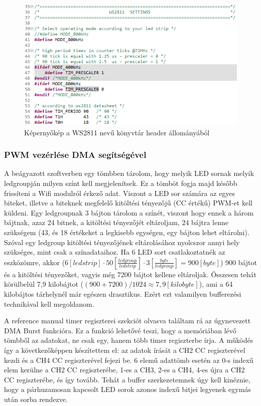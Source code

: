 \documentclass[../main.tex]{subfiles}
\begin{document}
            \begin{figure}[h!]
                \centering
                    \includegraphics[width=12cm]{mbed_res/ws2811_timing_values}
                \caption{Képernyőkép a WS2811 nevű könyvtár header állományából}
                \label{fig:ws2811_timing_values}
            \end{figure}
         
        \subsubsection{PWM vezérlése DMA segítségével}  
             A beágyazott szoftverben egy tömbben tárolom, hogy melyik LED sornak melyik ledgroupján milyen színt kell megjelenítsek. Ez a tömböt fogja majd később frissíteni a Wifi modulról érkező adat. Viszont a LED sor számára az egyes biteket, illetve a biteknek megfelelő kitöltési tényezőjű (CC értékű) PWM-et kell küldeni. Egy ledgroupnak 3 bájton tárolom a színét, viszont hogy ennek a három bájtnak, azaz 24 bitnek, a kitöltési tényezőjét eltároljam, 24 bájtra lenne szükségem (43, és 18 értékeket a legkisebb egységen, egy bájton lehet eltárolni). Szóval egy ledgroup kitöltési tényezőjének eltárolásához nyolcszor annyi hely szükséges, mint csak a színadataihoz. Ha 6 LED sort csatlakoztatnék az eszközömre, akkor ($ 6[ledstrip]\cdot 50 [\frac{ledgroup}{ledstrip}] \cdot 3 [\frac{byte}{ledgroup}] = 900 [byte]$) 900 bájtot és a kitöltési tényezőket, vagyis még 7200 bájtot kellene eltároljak. Összesen tehát körülbelül 7,9 kilobájtot ($ (900+7200)/1024 \approx 7,9[kilobyte]$), ami a 64 kilobájtos tárhelynél már egészen drasztikus. Ezért ezt valamilyen bufferezési technikával kell megoldanom.
             
             A reference manual \cite{rm0008} timer regiszterei szekciót olvasva találtam rá az úgynevezett DMA Burst funkcióra. Ez a funkció lehetővé teszi, hogy a memóriában lévő tömbből az adatokat, ne csak egy, hanem több timer regiszterbe írja. A működés így a következőképpen készítettem el: az adatok írását a CH2 CC regiszterével kezdi és a CH4 CC regiszterével fejezi be. 6 elemű adattömb esetén az 0-s indexű elem kerülne a CH2 CC regiszterébe, 1-es a CH3, 2-es a CH4, 4-es újra a CH2 CC regiszterébe, és így tovább. Tehát a buffer szerkezetemnek úgy kell kinéznie, hogy a párhuzamosan kapcsolt LED sorok azonos indexű bitjei legyenek egymás után sorba rendezve.
             
\end{document}
